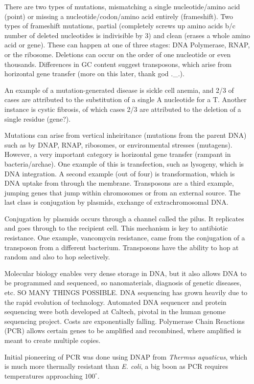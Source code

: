 \documentclass[12pt]{article}
\begin{document}
There are two types of mutations, mismatching a single nucleotide/amino acid (point) or missing a nucleotide/codon/amino acid entirely (frameshift). Two types of frameshift mutations, partial (completely screws up amino acids b/c number of deleted nucleotides is indivisible by 3) and clean (erases a whole amino acid or gene). These can happen at one of three stages: DNA Polymerase, RNAP, or the ribosome. Deletions can occur on the order of one nucleotide or even thousands. Differences in GC content suggest transposons, which arise from horizontal gene transfer (more on this later, thank god .\_.).

An example of a mutation-generated disease is sickle cell anemia, and 2/3 of cases are attributed to the substitution of a single A nucleotide for a T. Another instance is cystic fibrosis, of which cases 2/3 are attributed to the deletion of a single residue (gene?). 

Mutations can arise from vertical inheiritance (mutations from the parent DNA) such as by DNAP, RNAP, ribosomes, or environmental stresses (mutagens). However, a very important category is horizontal gene transfer (rampant in bacteria/archae). One example of this is transfection, such as lysogeny, which is DNA integration. A second example (out of four) is transformation, which is DNA uptake from through the membrane. Transposons are a third example, jumping genes that jump within chromosomes or from an external source. The last class is conjugation by plasmids, exchange of extrachromosomal DNA. 

Conjugation by plasmids occurs through a channel called the pilus. It replicates and goes through to the recipient cell. This mechanism is key to antibiotic resistance. One example, vancomycin resistance, came from the conjugation of a transposon from a different bacterium. Transposons have the ability to hop at random and also to hop selectively. 

Molecular biology enables very dense storage in DNA, but it also allows DNA to be programmed and sequenced, so nanomaterials, diagnosis of genetic diseases, etc. SO MANY THINGS POSSIBLE. DNA sequencing has grown heavily due to the rapid evolution of technology. Automated DNA sequencer and protein sequencing were both developed at Caltech, pivotal in the human genome sequencing project. Costs are exponentially falling. Polymerase Chain Reactions (PCR) allows certain genes to be amplified and recombined, where amplified is meant to create multiple copies.

Initial pioneering of PCR was done using DNAP from \emph{Thermus aquaticus}, which is much more thermally resistant than \emph{E. coli}, a big boon as PCR requires temperatures approaching $100^\circ$. 
\end{document}
